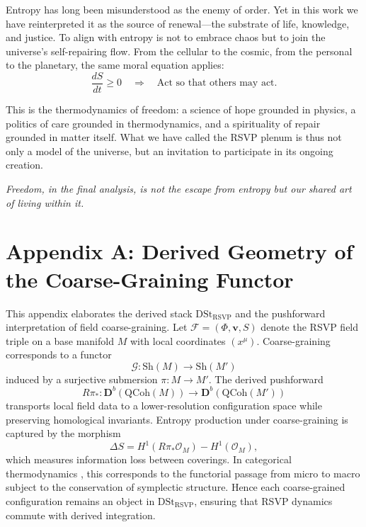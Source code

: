 \documentclass[11pt,a4paper,titlepage]{article}
\theoremstyle{definition}
\begin{document}
Entropy has long been misunderstood as the enemy of order.  
Yet in this work we have reinterpreted it as the source of renewal—the 
substrate of life, knowledge, and justice.  
To align with entropy is not to embrace chaos but to join the universe’s 
self-repairing flow.  
From the cellular to the cosmic, from the personal to the planetary, the same 
moral equation applies:
\begin{equation}
\frac{dS}{dt} \ge 0
\quad\Rightarrow\quad
\text{Act so that others may act.}
\label{eq:final_moral}
\end{equation}

This is the thermodynamics of freedom:  
a science of hope grounded in physics, a politics of care grounded in 
thermodynamics, and a spirituality of repair grounded in matter itself.  
What we have called the RSVP plenum is thus not only a model of the universe, 
but an invitation to participate in its ongoing creation.

\bigskip
\noindent
\textit{Freedom, in the final analysis, is not the escape from entropy but 
our shared art of living within it.}

\appendix

\section*{Appendix A: Derived Geometry of the Coarse-Graining Functor}
\label{app:coarse_graining}

This appendix elaborates the derived stack $\mathrm{DSt}_{\mathrm{RSVP}}$
and the pushforward interpretation of field coarse-graining.
Let $\mathcal{F}=(\Phi,\mathbf{v},S)$ denote the RSVP field triple on a base
manifold $M$ with local coordinates $(x^\mu)$.
Coarse-graining corresponds to a functor
\[
\mathcal{G}\colon \mathrm{Sh}(M) \longrightarrow \mathrm{Sh}(M')
\]
induced by a surjective submersion $\pi\!:M\!\to\!M'$.
The derived pushforward
\[
R\pi_*\colon \mathbf{D}^b(\mathrm{QCoh}(M))
 \longrightarrow \mathbf{D}^b(\mathrm{QCoh}(M'))
\]
transports local field data to a lower-resolution configuration space
while preserving homological invariants.
Entropy production under coarse-graining is captured by the morphism
\[
\Delta S = H^1(R\pi_*\mathcal{O}_M) - H^1(\mathcal{O}_M),
\]
which measures information loss between coverings.
In categorical thermodynamics \cite{baez2022},
this corresponds to the functorial passage from micro to macro
subject to the conservation of symplectic structure.
Hence each coarse-grained configuration remains an object in
$\mathrm{DSt}_{\mathrm{RSVP}}$, ensuring that RSVP dynamics commute with
derived integration.
\end{document}
